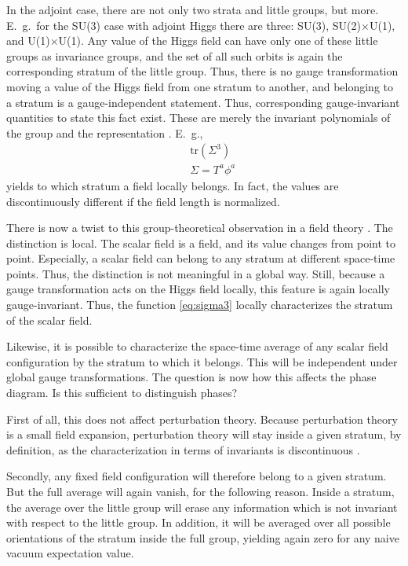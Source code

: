 \documentclass[final,12pt]{article}
\newcommand*{\no}{\noindent}
\newcommand*{\bea}{\begin{eqnarray}}
\newcommand*{\eea}{\end{eqnarray}}
\newcommand*{\nn}{\nonumber}
\newcommand*{\tr}{\mathrm{tr}}
\newcommand*{\1}{1\!\!\!\bot}
\begin{document}
In the adjoint case, there are not only two strata and little groups, but more. E.\ g.\ for the SU(3) case with adjoint Higgs there are three: SU(3), SU(2)$\times$U(1), and U(1)$\times$U(1). Any value of the Higgs field can have only one of these little groups as invariance groups, and the set of all such orbits is again the corresponding stratum of the little group. Thus, there is no gauge transformation moving a value of the Higgs field from one stratum to another, and belonging to a stratum is a gauge-independent statement. Thus, corresponding gauge-invariant quantities to state this fact exist. These are merely the invariant polynomials of the group and the representation \cite{O'Raifeartaigh:1986vq}. E.\ g., 
\bea
&&\tr\left(\Sigma^{3}\right)\label{eq:sigma3}\\
&&\Sigma=T^a\phi^a\nn
\eea
\no yields to which stratum a field locally belongs. In fact, the values are discontinuously different if the field length is normalized.

There is now a twist to this group-theoretical observation in a field theory \cite{Maas:2017xzh}. The distinction is local. The scalar field is a field, and its value changes from point to point. Especially, a scalar field can belong to any stratum at different space-time points. Thus, the distinction is not meaningful in a global way. Still, because a gauge transformation acts on the Higgs field locally, this feature is again locally gauge-invariant. Thus, the function \eqref{eq:sigma3} locally characterizes the stratum of the scalar field.

Likewise, it is possible to characterize the space-time average of any scalar field configuration by the stratum to which it belongs. This will be independent under global gauge transformations. The question is now how this affects the phase diagram. Is this sufficient to distinguish phases?

First of all, this does not affect perturbation theory. Because perturbation theory is a small field expansion, perturbation theory will stay inside a given stratum, by definition, as the characterization in terms of invariants is discontinuous \cite{O'Raifeartaigh:1986vq}.

Secondly, any fixed field configuration will therefore belong to a given stratum. But the full average will again vanish, for the following reason. Inside a stratum, the average over the little group will erase any information which is not invariant with respect to the little group. In addition, it will be averaged over all possible orientations of the stratum inside the full group, yielding again zero for any naive vacuum expectation value. 
\end{document}
